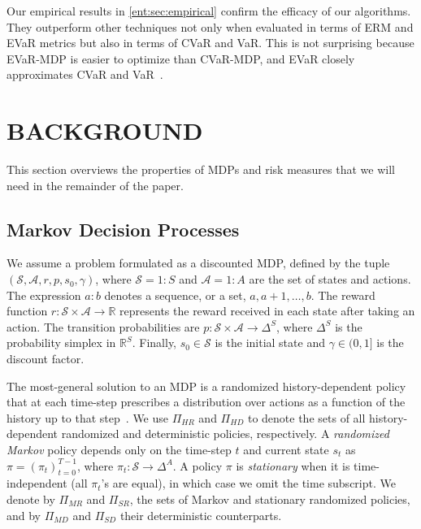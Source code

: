 \documentclass[twoside]{article}
\newcommand{\states}{\mathcal{S}}
\newcommand{\actions}{\mathcal{A}}
\newcommand{\Real}{\mathbb{R}}
\theoremstyle{plain}
\theoremstyle{definition}
\theoremstyle{remark}
\renewcommand{\cite}[1]{\citep{#1}}
\begin{document}
Our empirical results in \cref{ent:sec:empirical} confirm the efficacy of our algorithms. They outperform other techniques not only when evaluated in terms of ERM and EVaR metrics but also in terms of CVaR and VaR. This is not surprising because EVaR-MDP is easier to optimize than CVaR-MDP, and EVaR closely approximates CVaR and VaR~\cite{Ahmadi-Javid2012}.


\section{BACKGROUND} 
\label{ent:sec:preliminaries}

This section overviews the properties of MDPs and risk measures that we will need in the remainder of the paper.


\subsection{Markov Decision Processes}
\label{ent:subsec:MDP}

We assume a problem formulated as a discounted MDP, defined by the tuple $(\states, \actions, r, p, s_0, \gamma)$, where $\states = 1{:}S$ and $\actions = 1{:}A$ are the set of states and actions. The expression $a{:}b$ denotes a sequence, or a set, $a, a+1, \dots , b$. The reward function $r\colon \states \times \actions \to \Real$ represents the reward received in each state after taking an action. The transition probabilities are $p\colon\states \times \actions \to \Delta^S$, where $\Delta^S$ is the probability simplex in $\Real^S$. Finally, $s_0\in \states$ is the initial state and $\gamma \in (0,1]$ is the discount factor.

The most-general solution to an MDP is a randomized history-dependent policy that at each time-step prescribes a distribution over actions as a function of the history up to that step~\cite{Puterman2005}. We use $\Pi_{HR}$ and $\Pi_{HD}$ to denote the sets of all history-dependent randomized and deterministic policies, respectively. A \emph{randomized Markov} policy depends only on the time-step $t$ and current state $s_t$ as $\pi=(\pi_t)_{t=0}^{T-1}$, where $\pi_t\colon \states \to \Delta^A$. A policy $\pi$ is \emph{stationary} when it is time-independent (all $\pi_t$'s are equal), in which case we omit the time subscript. We denote by $\Pi_{MR}$ and $\Pi_{SR}$, the sets of Markov and stationary randomized policies, and by $\Pi_{MD}$ and $\Pi_{SD}$ their deterministic counterparts. %
\end{document}
